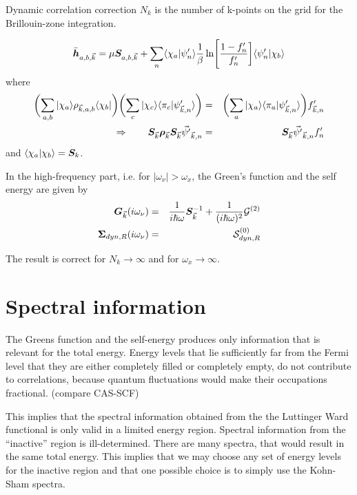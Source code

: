 \documentclass[11pt,a4paper]{report}
\begin{document}
\begin{myshadowminipage}{Dynamic correlation correction}
$N_k$ is the number of k-points on the grid for the Brillouin-zone
integration.

\begin{eqnarray}
\bar{\bm{h}}_{a,b,\vec{k}}=
\mu\bm{S}_{a,b,\vec{k}}+
\sum_n\langle\chi_a|\psi'_n\rangle\frac{1}{\beta}
\ln\Biggl[\frac{1-f'_n}{f'_n}\biggr]\langle\psi'_n|\chi_b\rangle
\end{eqnarray}
where
\begin{eqnarray}
\biggl(\sum_{a,b}|\chi_a\rangle\rho_{\vec{k},a,b}\langle\chi_b|\biggr)
\biggl(\sum_c|\chi_c\rangle\langle\pi_c|\psi'_{\vec{k},n}\rangle\biggr)
&=&\biggl(\sum_a|\chi_a\rangle\langle\pi_a|\psi'_{\vec{k},n}\rangle\biggr) 
f'_{\vec{k},n}
\nonumber\\
\Rightarrow\qquad
\bm{S}_{\vec{k}}\bm{\rho}_{\vec{k}}\bm{S}_{\vec{k}} \vec{\psi'}_{\vec{k},n}
&=&\bm{S}_{\vec{k}}\vec{\psi'}_{\vec{k},n} f'_n
\end{eqnarray}
and $\langle\chi_a|\chi_b\rangle=\bm{S}_{k}$.

In the high-frequency part, i.e. for $|\omega_\nu|>\omega_x$, the
Green's function and the self energy are given by
\begin{eqnarray}
\bm{G}_{\vec{k}}(i\omega_\nu)&=&\frac{1}{i\hbar\omega}\bm{S}^{-1}_{\vec{k}}
+\frac{1}{(i\hbar\omega)^2}\mathcal{\bm{G}}^{(2)}
\nonumber\\
\bm{\Sigma}_{dyn,R}(i\omega_\nu)&=&\mathcal{\bm{S}}^{(0)}_{dyn,R}
\end{eqnarray}

The result is correct for $N_k\rightarrow\infty$ and for
$\omega_x\rightarrow\infty$.
\end{myshadowminipage}

\section{Spectral information}
The Greens function and the self-energy produces only information that
is relevant for the total energy. Energy levels that lie sufficiently
far from the Fermi level that they are either completely filled or
completely empty, do not contribute to correlations, because quantum
fluctuations would make their occupations fractional. (compare
CAS-SCF)

This implies that the spectral information obtained from the the
Luttinger Ward functional is only valid in a limited energy region. 
Spectral information from the ``inactive'' region is ill-determined.
There are many spectra, that would result in the same total energy.
This implies that we may choose any set of energy levels for the
inactive region and that one possible choice is to simply use the
Kohn-Sham spectra. 
\end{document}
